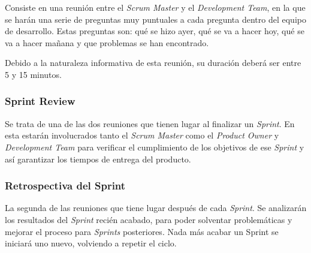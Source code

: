 Consiste en una reunión entre el \textit{Scrum Master} y el \textit{Development Team}, en la que se harán una serie de preguntas muy puntuales a cada pregunta dentro del equipo de desarrollo. Estas preguntas son: qué se hizo ayer, qué se va a hacer hoy, qué se va a hacer mañana y que problemas se han encontrado.

Debido a la naturaleza informativa de esta reunión, su duración deberá ser entre 5 y 15 minutos. 
\subsubsection{Sprint Review}
Se trata de una de las dos reuniones que tienen lugar al finalizar un \textit{Sprint}. En esta estarán involucrados tanto el \textit{Scrum Master} como el \textit{Product Owner} y \textit{Development Team} para verificar el cumplimiento de los objetivos de ese \textit{Sprint} y así garantizar los tiempos de entrega del producto.
\subsubsection{Retrospectiva del Sprint}
La segunda de las reuniones que tiene lugar después de cada \textit{Sprint}. Se analizarán los resultados del \textit{Sprint} recién acabado, para poder solventar problemáticas y mejorar el proceso para \textit{Sprints} posteriores. Nada más acabar un Sprint se iniciará uno nuevo, volviendo a repetir el ciclo.
